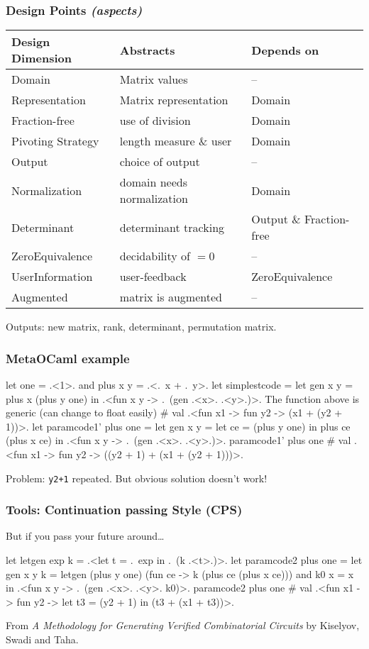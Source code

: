\documentclass{beamer}
\begin{document}
\begin{frame}
\frametitle{Design Points \emph{(aspects)}}
\begin{tabular}{@{}l|l|l@{}} \hline
    Design Dimension & Abstracts & Depends on \\ \hline
    Domain & Matrix values & -- \\ \hline
    Representation & Matrix representation & Domain \\ \hline
    Fraction-free & use of division & Domain \\ \hline
    Pivoting Strategy & length measure \& user & Domain \\ \hline
    Output & choice of output & -- \\ \hline
    Normalization & domain needs normalization & Domain \\ \hline
    Determinant & determinant tracking & Output \& Fraction-free \\ \hline
    ZeroEquivalence & decidability of $=0$ & -- \\ \hline
    UserInformation & user-feedback & ZeroEquivalence\\ \hline
    Augmented & matrix is augmented & -- \\ \hline
\end{tabular}

\vspace{5mm}
Outputs: new matrix, rank, determinant, permutation matrix.
\end{frame}

\begin{frame}[fragile]
\frametitle{MetaOCaml example}
\begin{code}
let one = .<1>. and plus x y = .<.~x + .~y>.
let simplestcode = let gen x y = plus x (plus y one) in
  .<fun x y -> .~(gen .<x>. .<y>.)>.
The function above is generic (can change to float easily)
# val .<fun x1 -> fun y2 -> (x1 + (y2 + 1))>.
let paramcode1' plus one =
  let gen x y = let ce = (plus y one) in  plus ce (plus x ce) in
  .<fun x y -> .~(gen .<x>. .<y>.)>.
paramcode1' plus one
# val .<fun x1 -> fun y2 -> ((y2 + 1) + (x1 + (y2 + 1)))>.
\end{code}
Problem: \verb=y2+1= repeated.  But obvious solution doesn't work!
\end{frame}

\begin{frame}[fragile]
    \frametitle{Tools: Continuation passing Style (CPS)}
    But if you pass your future around\dots
\begin{code}
let letgen exp k = .<let t = .~exp in .~(k .<t>.)>.
let paramcode2 plus one =
  let gen x y k = letgen (plus y one) 
                  (fun ce -> k (plus ce (plus x ce)))
  and k0 x = x
  in .<fun x y -> .~(gen .<x>. .<y>. k0)>.
paramcode2 plus one
# val .<fun x1 -> fun y2 -> 
           let t3 = (y2 + 1) in (t3 + (x1 + t3))>.
\end{code}
From \textit{A Methodology for Generating Verified Combinatorial Circuits} by 
Kiselyov, Swadi and Taha.
\end{frame}
\end{document}
